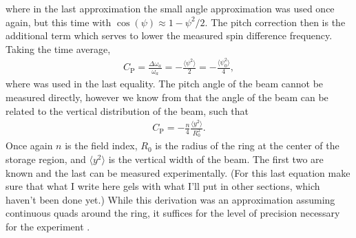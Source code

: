 where in the last approximation the small angle approximation was used once again, but this time with $\cos(\psi) \approx 1 - \psi^{2}/2$. The pitch correction then is the additional term which serves to lower the measured spin difference frequency. Taking the time average,
        \begin{align}
            C_{\text{P}} = \frac{\Delta\omega_{a}}{\omega_{a}} = - \frac{\langle \psi^{2} \rangle}{2} = - \frac{\langle \psi_{0}^{2} \rangle}{4},
        \end{align}
where  was used in the last equality. The pitch angle of the beam cannot be measured directly, however we know from  that the angle of the beam can be related to the vertical distribution of the beam, such that 
        \begin{align}
            C_{\text{P}} = - \frac{n}{4} \frac{\langle y^{2} \rangle}{R_{0}^{2}}.
        \end{align}
Once again $n$ is the field index, $R_{0}$ is the radius of the ring at the center of the storage region, and $\langle y^{2} \rangle$ is the vertical width of the beam. The first two are known and the last can be measured experimentally. (For this last equation make sure that what I write here gels with what I'll put in other sections, which haven't been done yet.) While this derivation was an approximation assuming continuous quads around the ring, it suffices for the level of precision necessary for the \gmtwo experiment \cite{something}.





\clearpage




